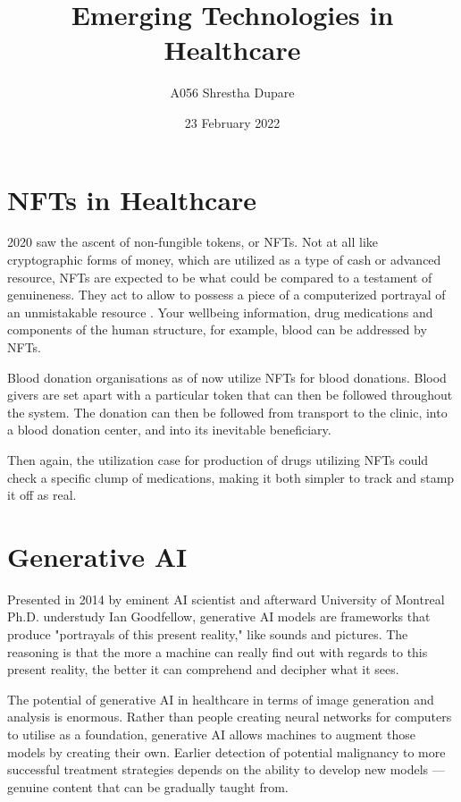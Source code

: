 \documentclass[11pt]{article}
\title{Emerging Technologies in Healthcare}
\author{A056 Shrestha Dupare}
\date{23 February 2022}
\begin{document}
\maketitle

\section{NFTs in Healthcare}

2020 saw the ascent of non-fungible tokens, or NFTs. Not at all like cryptographic forms of money, which are utilized as a type of cash or advanced resource, NFTs are expected to be what could be compared to a testament of genuineness. They act to allow to possess a piece of a computerized portrayal of an unmistakable resource . Your wellbeing information, drug medications and components of the human structure, for example, blood can be addressed by NFTs.


Blood donation organisations as of now utilize NFTs for blood donations. Blood givers are set apart with a particular token that can then be followed throughout the system. The donation can then be followed from transport to the clinic, into a blood donation center, and into its inevitable beneficiary.


Then again, the utilization case for production of drugs utilizing NFTs could check a specific clump of medications, making it both simpler to track and stamp it off as real.


\section{Generative AI}

Presented in 2014 by eminent AI scientist and afterward University of Montreal Ph.D. understudy Ian Goodfellow, generative AI models are frameworks that produce "portrayals of this present reality," like sounds and pictures. The reasoning is that the more a machine can really find out with regards to this present reality, the better it can comprehend and decipher what it sees.


The potential of generative AI in healthcare in terms of image generation and analysis is enormous. Rather than people creating neural networks for computers to utilise as a foundation, generative AI allows machines to augment those models by creating their own. Earlier detection of potential malignancy to more successful treatment strategies depends on the ability to develop new models — genuine content that can be gradually taught from.
\end{document}
